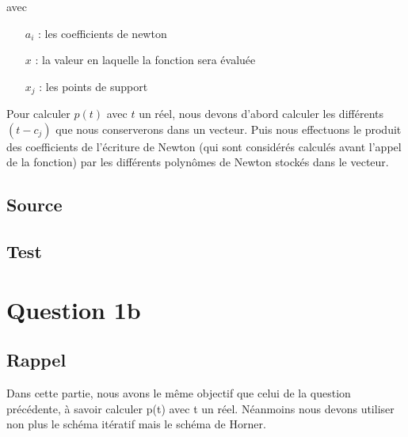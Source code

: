 \documentclass[a4paper,10pt]{report}
\begin{document}
avec
\begin{itemize}
	\item[$a_{i}$] : les coefficients de newton
	\item[$x$]  : la valeur en laquelle la fonction sera évaluée
    \item[$x_{j}$] : les points de support
\end{itemize}
    
Pour calculer $p(t)$ avec $t$ un réel, nous devons d’abord calculer les différents $(t-c_{j})$ que nous conserverons dans un vecteur. Puis nous effectuons le produit des coefficients de l’écriture de Newton (qui sont considérés calculés avant l’appel de la fonction) par les différents polynômes de Newton stockés dans le vecteur.

\subsection*{Source}

\begin{center}
	
\end{center}

\begin{center}
	
\end{center}

\subsection*{Test}

\begin{center}
	
\end{center}

\section*{Question 1b}

\subsection*{Rappel}

Dans cette partie, nous avons le même objectif que celui de la question précédente, à savoir calculer p(t) avec t un réel. Néanmoins nous devons utiliser non plus le schéma itératif mais le schéma de Horner. 
\end{document}
